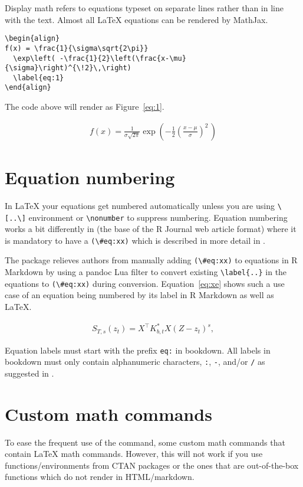 Display math refers to equations typeset on separate lines rather than in line with the text. Almost all LaTeX equations can be rendered by
MathJax.

\begin{verbatim}
\begin{align}
f(x) = \frac{1}{\sigma\sqrt{2\pi}} 
  \exp\left( -\frac{1}{2}\left(\frac{x-\mu}{\sigma}\right)^{\!2}\,\right)
  \label{eq:1}
\end{align}
\end{verbatim}
The code above will render as Figure~\ref{eq:1}.

\begin{align}
\label{eq:1}
f(x) = \frac{1}{\sigma\sqrt{2\pi}} 
  \exp\left( -\frac{1}{2}\left(\frac{x-\mu}{\sigma}\right)^{\!2}\,\right)
\end{align}

\section{Equation numbering}
In LaTeX your equations get numbered automatically unless you are using \verb|\[..\]| environment or \verb|\nonumber| to suppress
numbering. Equation numbering works a bit differently in  (the base of the R Journal web article format) where
it is mandatory to have a \verb|(\#eq:xx)| which is described in more detail in \citet{bookdown}.

The  package relieves authors from manually adding \verb|(\#eq:xx)| to equations in R Markdown
by using a pandoc Lua filter to convert existing \verb|\label{..}| in the equations to \verb|(\#eq:xx)|
during conversion. Equation~\ref{eq:xe} shows such a use case of an equation being numbered by its label in R Markdown
as well as LaTeX.

\begin{align}
S_{T, s}(z_t) = X^{\top} K_{b,t}^* X (Z - z_t)^s, 
\label{eq:xe}
\end{align}

Equation labels must start with the prefix \verb|eq:| in bookdown. All labels in bookdown must only contain alphanumeric characters, \verb|:|, \verb|-|, and/or \verb|/| as suggested in \citep{bookdown}. 

\section{Custom math commands}

To ease the frequent use of the command, some custom math commands that contain LaTeX math commands. 
However, this will not work if you use functions/environments from CTAN packages or 
the ones that are out-of-the-box functions which do not render in HTML/markdown.

